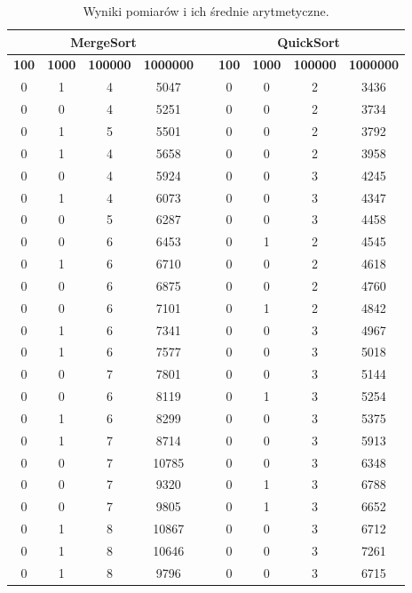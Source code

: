 \documentclass[11pt,a4paper]{article}
\begin{document}
\begin{table}[htbp]
\caption{Wyniki pomiarów i ich średnie arytmetyczne.}
\begin{center}
\begin{tabular}{|c|c|c|c|c|c|c|c|c|}
\hline
\multicolumn{ 4}{|c|}{\textbf{MergeSort}} & \textbf{} & \multicolumn{ 4}{c|}{\textbf{QuickSort}} \\ \hline
\textbf{100} & \textbf{1000} & \textbf{100000} & \textbf{1000000} & \textbf{} & \textbf{100} & \textbf{1000} & \textbf{100000} & \textbf{1000000} \\ \hline
0 & 1 & 4 & 5047 &  & 0 & 0 & 2 & 3436 \\ \hline
0 & 0 & 4 & 5251 &  & 0 & 0 & 2 & 3734 \\ \hline
0 & 1 & 5 & 5501 &  & 0 & 0 & 2 & 3792 \\ \hline
0 & 1 & 4 & 5658 &  & 0 & 0 & 2 & 3958 \\ \hline
0 & 0 & 4 & 5924 &  & 0 & 0 & 3 & 4245 \\ \hline
0 & 1 & 4 & 6073 &  & 0 & 0 & 3 & 4347 \\ \hline
0 & 0 & 5 & 6287 &  & 0 & 0 & 3 & 4458 \\ \hline
0 & 0 & 6 & 6453 &  & 0 & 1 & 2 & 4545 \\ \hline
0 & 1 & 6 & 6710 &  & 0 & 0 & 2 & 4618 \\ \hline
0 & 0 & 6 & 6875 &  & 0 & 0 & 2 & 4760 \\ \hline
0 & 0 & 6 & 7101 &  & 0 & 1 & 2 & 4842 \\ \hline
0 & 1 & 6 & 7341 &  & 0 & 0 & 3 & 4967 \\ \hline
0 & 1 & 6 & 7577 &  & 0 & 0 & 3 & 5018 \\ \hline
0 & 0 & 7 & 7801 &  & 0 & 0 & 3 & 5144 \\ \hline
0 & 0 & 6 & 8119 &  & 0 & 1 & 3 & 5254 \\ \hline
0 & 1 & 6 & 8299 &  & 0 & 0 & 3 & 5375 \\ \hline
0 & 1 & 7 & 8714 &  & 0 & 0 & 3 & 5913 \\ \hline
0 & 0 & 7 & 10785 &  & 0 & 0 & 3 & 6348 \\ \hline
0 & 0 & 7 & 9320 &  & 0 & 1 & 3 & 6788 \\ \hline
0 & 0 & 7 & 9805 &  & 0 & 1 & 3 & 6652 \\ \hline
0 & 1 & 8 & 10867 &  & 0 & 0 & 3 & 6712 \\ \hline
0 & 1 & 8 & 10646 &  & 0 & 0 & 3 & 7261 \\ \hline
0 & 1 & 8 & 9796 &  & 0 & 0 & 3 & 6715 \\ \hline

\end{tabular}
\end{center}
\end{table}
\end{document}
